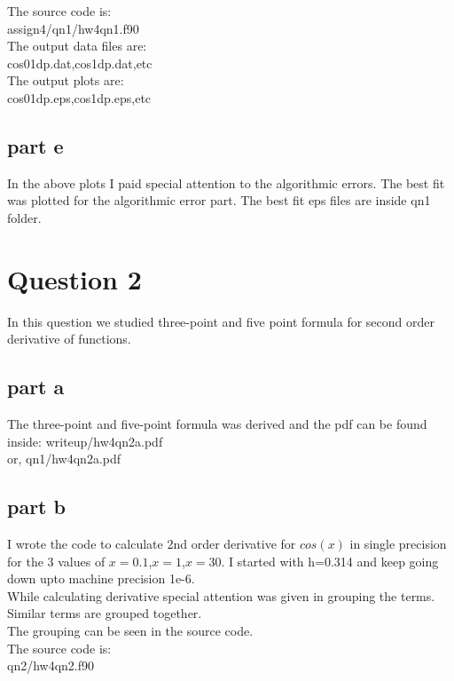 \documentclass[11pt,a4paper,english]{article}
\begin{document}
	
	The source code is:\\
	assign4/qn1/hw4qn1.f90\\
	
	The output data files are:\\
	cos01dp.dat,cos1dp.dat,etc\\
	
	The output plots are:\\
	cos01dp.eps,cos1dp.eps,etc\\
	
	
	
	\subsection{part e}
	In the above plots I paid special attention to the algorithmic errors.
	The best fit was plotted for the algorithmic error part.
	The best fit eps files are inside qn1 folder.
	

	
\section{Question 2}
In this question we studied three-point and five point formula for second order derivative
of functions.
\subsection{part a}
The three-point and five-point formula was derived and the pdf can be
found inside:
writeup/hw4qn2a.pdf\\
or, qn1/hw4qn2a.pdf\\


\subsection{part b}
I wrote the code to calculate 2nd order derivative for $cos(x)$ in single precision for the 3 values of 
$x=0.1$,$x=1$,$x=30$. I started with h=0.314 and keep going down upto machine precision 1e-6.\\
While calculating derivative special attention was given in grouping the terms. Similar terms are grouped
together.\\
The grouping can be seen in the source code.\\
The source code is:\\
qn2/hw4qn2.f90\\
\end{document}
